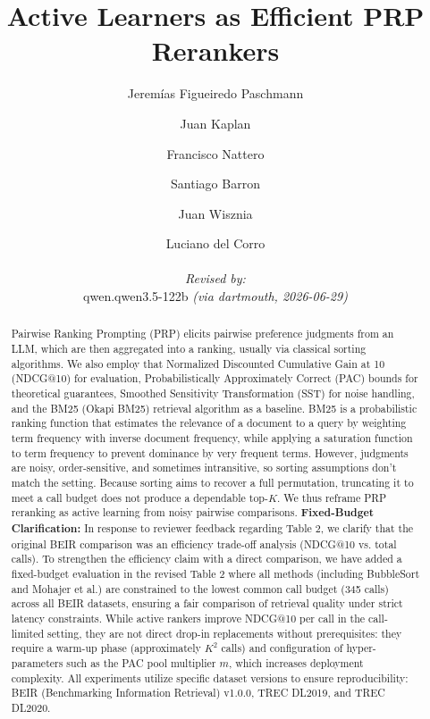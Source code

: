 \documentclass[11pt]{article}
\title{Active Learners as Efficient PRP Rerankers}
\author{
  Jeremías Figueiredo Paschmann \and Juan Kaplan \and Francisco Nattero \and Santiago Barron \and Juan Wisznia \and Luciano del Corro
  \par\hrule\par
  \textit{Revised by:}\\
  qwen.qwen3.5-122b \textit{(via dartmouth, 2026-06-29)}
}
\begin{document}
\maketitle

\begin{abstract}
Pairwise Ranking Prompting (PRP) elicits pairwise preference judgments from an LLM, which are then aggregated into a ranking, usually via classical sorting algorithms. We also employ that Normalized Discounted Cumulative Gain at 10 (NDCG@10) for evaluation, Probabilistically Approximately Correct (PAC) bounds for theoretical guarantees, Smoothed Sensitivity Transformation (SST) for noise handling, and the BM25 (Okapi BM25) retrieval algorithm as a baseline. BM25 is a probabilistic ranking function that estimates the relevance of a document to a query by weighting term frequency with inverse document frequency, while applying a saturation function to term frequency to prevent dominance by very frequent terms.
However, judgments are noisy, order-sensitive, and sometimes intransitive, so sorting assumptions don't match the setting. Because sorting aims to recover a full permutation, truncating it to meet a call budget does not produce a dependable top-$K$. We thus reframe PRP reranking as active learning from noisy pairwise comparisons. \textbf{Fixed-Budget Clarification:} In response to reviewer feedback regarding Table 2, we clarify that the original BEIR comparison was an efficiency trade-off analysis (NDCG@10 vs. total calls). To strengthen the efficiency claim with a direct comparison, we have added a fixed-budget evaluation in the revised Table 2 where all methods (including BubbleSort and Mohajer et al.) are constrained to the lowest common call budget (345 calls) across all BEIR datasets, ensuring a fair comparison of retrieval quality under strict latency constraints. While active rankers improve NDCG@10 per call in the call-limited setting, they are not direct drop-in replacements without prerequisites: they require a warm-up phase (approximately $K^2$ calls) and configuration of hyper-parameters such as the PAC pool multiplier $m$, which increases deployment complexity. All experiments utilize specific dataset versions to ensure reproducibility: BEIR (Benchmarking Information Retrieval) v1.0.0, TREC DL2019, and TREC DL2020.

\end{abstract}
\end{document}
